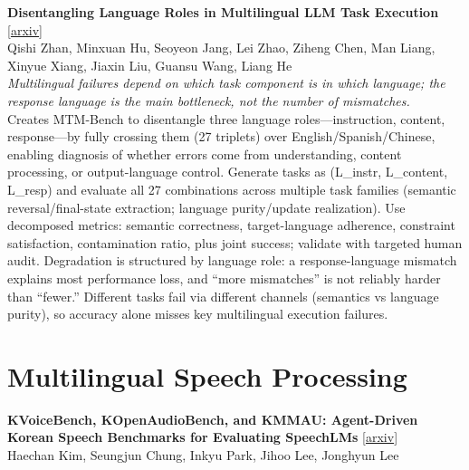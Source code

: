 \documentclass[12pt,letterpaper]{article}
\begin{document}
\medskip

{\small\textbf{Disentangling Language Roles in Multilingual LLM Task Execution}} {\scriptsize[\href{https://arxiv.org/abs/2605.27649}{arxiv}]}\\
{\scriptsize Qishi Zhan, Minxuan Hu, Seoyeon Jang, Lei Zhao, Ziheng Chen, Man Liang, Xinyue Xiang, Jiaxin Liu, Guansu Wang, Liang He}\\

{\small\textit{Multilingual failures depend on which task component is in which language; the response language is the main bottleneck, not the number of mismatches.}}\\[1pt]
{\footnotesize Creates MTM-Bench to disentangle three language roles---instruction, content, response---by fully crossing them (27 triplets) over English/Spanish/Chinese, enabling diagnosis of whether errors come from understanding, content processing, or output-language control. Generate tasks as (L\_instr, L\_content, L\_resp) and evaluate all 27 combinations across multiple task families (semantic reversal/final-state extraction; language purity/update realization). Use decomposed metrics: semantic correctness, target-language adherence, constraint satisfaction, contamination ratio, plus joint success; validate with targeted human audit. Degradation is structured by language role: a response-language mismatch explains most performance loss, and ``more mismatches'' is not reliably harder than ``fewer.'' Different tasks fail via different channels (semantics vs language purity), so accuracy alone misses key multilingual execution failures.}

\medskip


\section*{Multilingual Speech Processing}

{\small\textbf{KVoiceBench, KOpenAudioBench, and KMMAU: Agent-Driven Korean Speech Benchmarks for Evaluating SpeechLMs}} {\scriptsize[\href{https://arxiv.org/abs/2605.27984}{arxiv}]}\\
{\scriptsize Haechan Kim, Seungjun Chung, Inkyu Park, Jihoo Lee, Jonghyun Lee}\\
\end{document}
